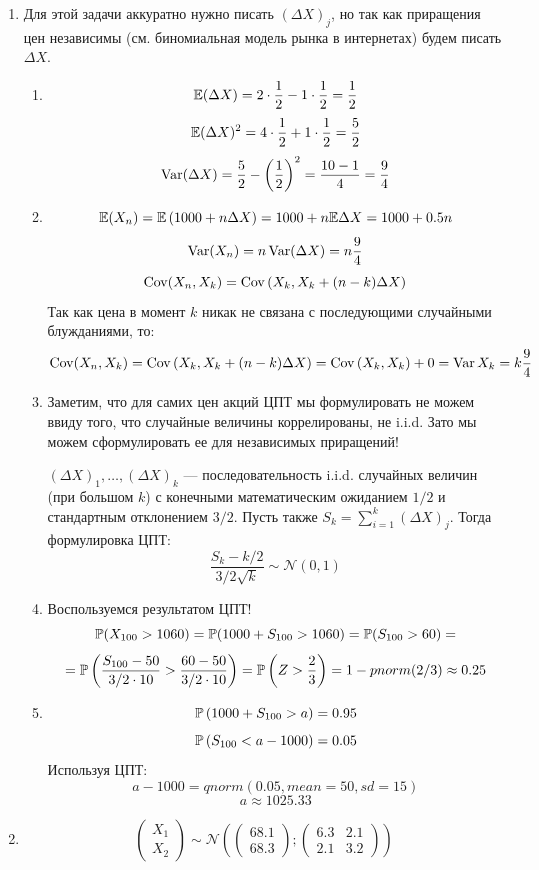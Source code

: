 \documentclass[12pt, a4paper]{article}\usepackage[]{graphicx}\usepackage[]{color}
\newcommand{\cN}{\mathcal{N}}
\begin{document}
\begin{enumerate}
\item
Для этой задачи аккуратно нужно писать \( \left(\Delta X \right)_j \), но так как приращения цен независимы (см. биномиальная модель рынка в интернетах) будем писать \( \Delta X \).
\begin{enumerate}
\item \[\E (\Delta X) = 2 \cdot \frac{1}{2} - 1 \cdot \frac{1}{2} = \frac{1}{2} \]
\[\E (\Delta X)^2 = 4 \cdot \frac{1}{2} + 1 \cdot \frac{1}{2} = \frac{5}{2} \]
\[\Var (\Delta X) = \frac{5}{2} - \left(\frac{1}{2}\right)^2 = \frac{10-1}{4}=\frac{9}{4} \]
\item \[\E (X_n) = \E \left(1000 + n\Delta X \right)  = 1000 + n \E \Delta X = 1000 + 0.5 n     \]
\[ \Var (X_n) = n \Var (\Delta X) = n \frac{9}{4}  \]
\[ \Cov (X_n, X_k) = \Cov \left(X_k, X_k + (n-k) \Delta X \right)     \]
Так как цена в момент $k$ никак не связана с последующими случайными блужданиями, то:
\[ \Cov (X_n, X_k) = \Cov \left(X_k, X_k + (n-k) \Delta X \right) =  \Cov \left(X_k, X_k \right) + 0 = \Var X_k = k \frac{9}{4}    \]
\item Заметим, что для самих цен акций ЦПТ мы формулировать не можем ввиду того, что случайные величины коррелированы, не i.i.d. Зато мы можем сформулировать ее для независимых приращений!

\( \left(\Delta X \right)_1, \ldots, \left(\Delta X \right)_{k} \) — последовательность i.i.d. случайных величин (при большом $k$) с конечными математическим ожиданием \(1/2 \) и стандартным отклонением \(3/2 \). Пусть также \( S_k = \sum_{i=1}^k \left(\Delta X \right)_j \). Тогда формулировка ЦПТ:
\[ \frac{S_k - k/2}{3/2 \sqrt{k}} \sim \cN(0,1)    \]
\item Воспользуемся результатом ЦПТ!
\[\P(X_{100} > 1060) = \P (1000 + S_{100} > 1060) = \P(S_{100} >60) = \]
\[ = \P \left(\frac{S_{100} -50 }{3/2\cdot 10} > \frac{60-50}{3/2 \cdot 10}\right) = \P \left(Z > \frac{2}{3}\right) = 1-pnorm(2/3) \approx 0.25   \]

\item \[ \P \left(1000 + S_{100} > a \right) = 0.95              \]
\[ \P \left( S_{100} < a-1000 \right) = 0.05              \]
Используя ЦПТ:
\[ a-1000 = qnorm(0.05, mean = 50, sd = 15 )            \]
\[ a \approx 1025.33   \]
\end{enumerate}

\item
\[\begin{pmatrix}
X_1 \\
X_2
\end{pmatrix} \sim \cN \left( \begin{pmatrix}
68.1 \\
68.3
\end{pmatrix} ; \begin{pmatrix}
6.3 & 2.1 \\
2.1 & 3.2
\end{pmatrix}                   \right)\]


\end{enumerate}
\end{document}
